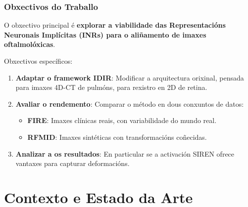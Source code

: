\documentclass[xcolor=dvipsnames]{beamer}
\begin{document}
\begin{frame}
    \frametitle{Obxectivos do Traballo}
    
    O obxectivo principal é \textbf{explorar a viabilidade das Representacións Neuronais Implícitas (INRs) para o aliñamento de imaxes oftalmolóxicas}.
    
    \vspace{0.4cm}
    
    Obxectivos específicos:
    \begin{enumerate}
        \item \textbf{Adaptar o framework IDIR}: Modificar a arquitectura orixinal, pensada para imaxes 4D-CT de pulmóns, para rexistro en 2D de retina.
        \item \textbf{Avaliar o rendemento}: Comparar o método en dous conxuntos de datos:
        \begin{itemize}
            \item \textbf{FIRE}: Imaxes clínicas reais, con variabilidade do mundo real.
            \item \textbf{RFMID}: Imaxes sintéticas con transformacións coñecidas.
        \end{itemize}
        \item \textbf{Analizar a os resultados}: En particular se a activación SIREN ofrece vantaxes para capturar deformacións.
    \end{enumerate}
    
\end{frame}


\section{Contexto e Estado da Arte}
\end{document}
